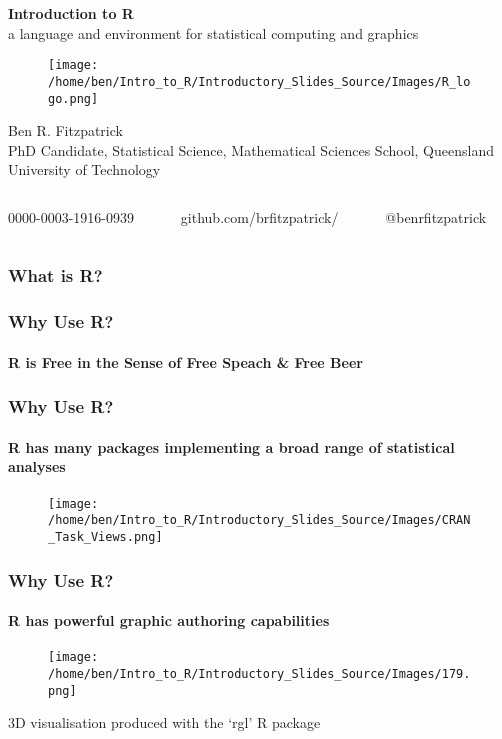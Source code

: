\documentclass[xcolor=dvipsnames]{beamer}
\begin{document}
\begin{frame} %
\textbf{\huge Introduction to R}\\
a language and environment for statistical computing and graphics %

\begin{figure}
\texttt{[image: /home/ben/Intro\_to\_R/Introductory\_Slides\_Source/Images/R\_logo.png]}
\end{figure}
\small Ben R. Fitzpatrick\\
\tiny PhD Candidate, Statistical Science, Mathematical Sciences School, Queensland University of Technology
\newline
\begin{columns}
\begin{column}{3cm}
\tiny 0000-0003-1916-0939
\end{column}
\begin{column}{3cm}
\tiny github.com/brfitzpatrick/
\end{column}
\begin{column}{3cm}
\tiny @benrfitzpatrick
\end{column}
\end{columns}
\end{frame}

\begin{frame} 
\frametitle{What is R?}
\end{frame}

\begin{frame} 
\frametitle{Why Use R?}
\framesubtitle{R is Free in the Sense of Free Speach \& Free Beer}
\end{frame}

\begin{frame} 
\frametitle{Why Use R?}
\framesubtitle{R has many packages implementing a broad range of statistical analyses}

\begin{figure}
\texttt{[image: /home/ben/Intro\_to\_R/Introductory\_Slides\_Source/Images/CRAN\_Task\_Views.png]}
\end{figure}

\end{frame}

\begin{frame} 
\frametitle{Why Use R?}
\framesubtitle{R has powerful graphic authoring capabilities}

\begin{figure}
\texttt{[image: /home/ben/Intro\_to\_R/Introductory\_Slides\_Source/Images/179.png]}
\end{figure}

\tiny 3D visualisation produced with the `rgl' R package

\end{frame}
\end{document}
